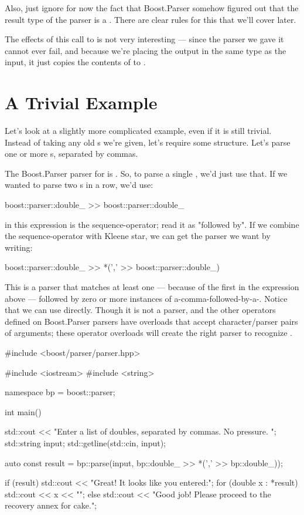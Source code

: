 \documentclass{MyBook}
\begin{document}
Also, just ignore for now the fact that Boost.Parser somehow figured out that the result type of the  parser is a . There are clear rules for this that we'll cover later.

The effects of this call to  is not very interesting --- since the parser we gave it cannot ever fail, and because we're placing the output in the same type as the input, it just copies the contents of  to .

\section{A Trivial Example}

Let's look at a slightly more complicated example, even if it is still trivial. Instead of taking any old s we're given, let's require some structure. Let's parse one or more s, separated by commas.

The Boost.Parser parser for  is . So, to parse a single , we'd just use that. If we wanted to parse two s in a row, we'd use:

\begin{code}
boost::parser::double_ >> boost::parser::double_
\end{code}

 in this expression is the sequence-operator; read it as "followed by". If we combine the sequence-operator with Kleene star, we can get the parser we want by writing:

\begin{code}
boost::parser::double_ >> *(',' >> boost::parser::double_)
\end{code}

This is a parser that matches at least one  --- because of the first  in the expression above --- followed by zero or more instances of a-comma-followed-by-a-. Notice that we can use  directly. Though it is not a parser,  and the other operators defined on Boost.Parser parsers have overloads that accept character/parser pairs of arguments; these operator overloads will create the right parser to recognize .

\begin{code}
#include <boost/parser/parser.hpp>

#include <iostream>
#include <string>


namespace bp = boost::parser;

int main()
{
    std::cout << "Enter a list of doubles, separated by commas.  No pressure. ";
    std::string input;
    std::getline(std::cin, input);

    auto const result = bp::parse(input, bp::double_ >> *(',' >> bp::double_));

    if (result) {
        std::cout << "Great! It looks like you entered:\n";
        for (double x : *result) {
            std::cout << x << "\n";
        }
    } else {
        std::cout
            << "Good job!  Please proceed to the recovery annex for cake.\n";
    }
}
\end{code}
\end{document}
